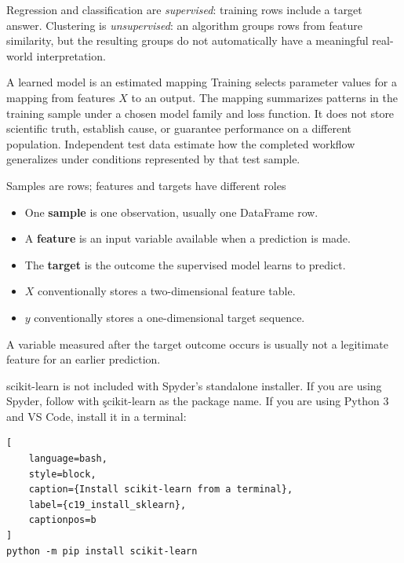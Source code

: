 Regression and classification are \emph{supervised}: training rows include a
target answer. Clustering is \emph{unsupervised}: an algorithm groups rows from
feature similarity, but the resulting groups do not automatically have a
meaningful real-world interpretation.

\begin{ExplainBox}{A learned model is an estimated mapping}
Training selects parameter values for a mapping from features $X$ to an output.
The mapping summarizes patterns in the training sample under a chosen model
family and loss function. It does not store scientific truth, establish cause,
or guarantee performance on a different population. Independent test data
estimate how the completed workflow generalizes under conditions represented
by that test sample.
\end{ExplainBox}

\begin{SyntaxBox}{Samples are rows; features and targets have different roles}
\begin{itemize}
    \item One \textbf{sample} is one observation, usually one DataFrame row.
    \item A \textbf{feature} is an input variable available when a prediction is made.
    \item The \textbf{target} is the outcome the supervised model learns to predict.
    \item $X$ conventionally stores a two-dimensional feature table.
    \item $y$ conventionally stores a one-dimensional target sequence.
\end{itemize}
A variable measured after the target outcome occurs is usually not a legitimate
feature for an earlier prediction.
\end{SyntaxBox}


scikit-learn is not included with Spyder's standalone installer. If you are
using Spyder, follow  with \c{scikit-learn} as the package name. If you are using
Python 3 and VS Code, install it in a terminal:

\begin{lstlisting}[
    language=bash,
    style=block,
    caption={Install scikit-learn from a terminal},
    label={c19_install_sklearn},
    captionpos=b
]
python -m pip install scikit-learn
\end{lstlisting}

